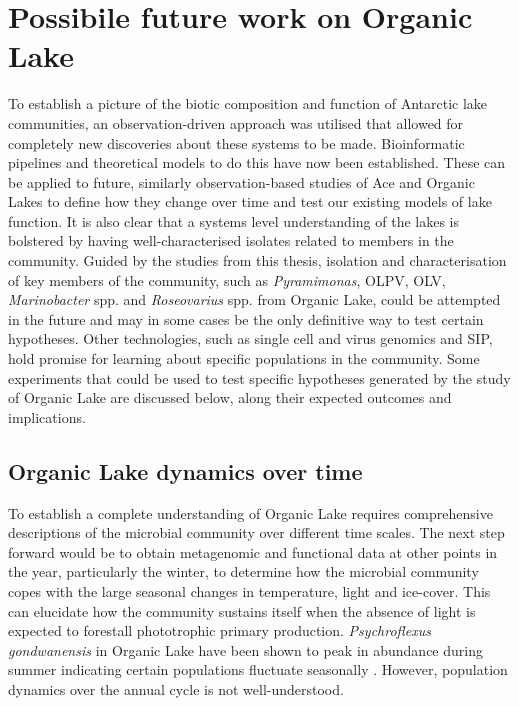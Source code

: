 \section{Possibile future work on Organic Lake}
To establish a picture of the biotic composition and function of Antarctic lake communities, an observation-driven approach was utilised that allowed for completely new discoveries about these systems to be made.
Bioinformatic pipelines and theoretical models to do this have now been established.
These can be applied to future, similarly observation-based studies of Ace and Organic Lakes to define how they change over time and test our existing models of lake function.
It is also clear that a systems level understanding of the lakes is bolstered by having well-characterised isolates related to members in the community.
Guided by the studies from this thesis, isolation and characterisation of key members of the community, such as \emph{Pyramimonas}, \ac{OLPV}, \ac{OLV}, \emph{Marinobacter} spp. and \emph{Roseovarius} spp. from Organic Lake, could be attempted in the future and may in some cases be the only definitive way to test certain hypotheses.
Other technologies, such as single cell and virus genomics and \ac{SIP}, hold promise for learning about specific populations in the community.
Some experiments that could be used to test specific hypotheses generated by the study of Organic Lake are discussed below, along their expected outcomes and implications.

\subsection{Organic Lake dynamics over time}
To establish a complete understanding of Organic Lake requires comprehensive descriptions of the microbial community over different time scales.
The next step forward would be to obtain metagenomic and functional data at other points in the year, particularly the winter, to determine how the microbial community copes with the large seasonal changes in temperature, light and ice-cover.
This can elucidate how the community sustains itself when the absence of light is expected to forestall phototrophic primary production.
\emph{Psychroflexus gondwanensis} in Organic Lake have been shown to peak in abundance during summer indicating certain populations fluctuate seasonally \cite{James1994}.
However, population dynamics over the annual cycle is not well-understood.

